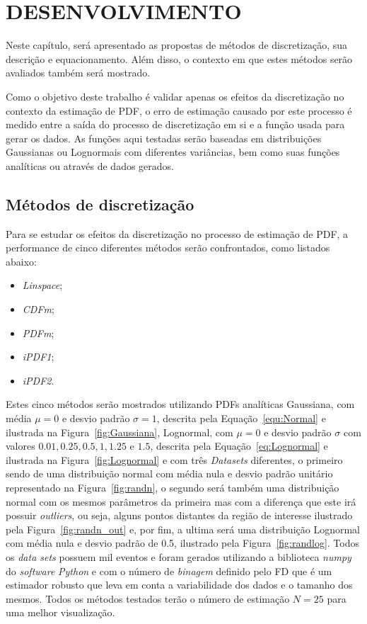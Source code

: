 \chapter{DESENVOLVIMENTO} \label{cap:desenvolvimento}
Neste capítulo, será apresentado as propostas de métodos de discretização, sua descrição e equacionamento. Além disso, o contexto em que estes métodos serão avaliados também será mostrado.

Como o objetivo deste trabalho é validar apenas os efeitos da discretização no contexto da estimação de \ac{PDF}, o erro de estimação causado por este processo é medido entre a saída do processo de discretização em si e a função usada para gerar os dados. As funções aqui testadas serão baseadas em distribuições Gaussianas ou Lognormais com diferentes variâncias, bem como suas funções analíticas ou através de dados gerados.

\section{Métodos de discretização}
\label{cap:anal}
Para se estudar os efeitos da discretização no processo de estimação de \ac{PDF}, a performance de cinco diferentes métodos serão confrontados, como listados abaixo: 
\begin{itemize}
	\item \textit{Linspace};
	\item \textit{CDFm};
	\item \textit{PDFm};
	\item \textit{iPDF1};
	\item \textit{iPDF2}.
\end{itemize}

Estes cinco métodos serão mostrados utilizando \ac{PDF}s analíticas Gaussiana, com média $\mu = 0$ e desvio padrão $\sigma = 1$, descrita pela Equação~\eqref{equ:Normal} e ilustrada na Figura~\ref{fig:Gaussiana}, Lognormal, com $\mu = 0$ e desvio padrão $\sigma$ com valores $0.01, 0.25, 0.5, 1, 1.25$ e $1.5$, descrita pela Equação~\eqref{eq:Lognormal} e ilustrada na Figura~\ref{fig:Lognormal} e com três \textit{Datasets} diferentes, o primeiro sendo de uma distribuição normal com média nula e desvio padrão unitário representado na Figura~\ref{fig:randn}, o segundo será também uma distribuição normal com os mesmos parâmetros da primeira mas com a diferença que este irá possuir \textit{outliers}, ou seja, alguns pontos distantes da região de interesse ilustrado pela Figura~\ref{fig:randn_out} e, por fim, a ultima será uma distribuição Lognormal com média nula e desvio padrão de 0.5, ilustrado pela Figura~\ref{fig:randlog}. Todos os \textit{data sets} possuem mil eventos e foram gerados utilizando a biblioteca \textit{numpy} do \textit{software} \textit{Python} e com o número de \textit{binagem} definido pelo \ac{FD} que é um estimador robusto que leva em conta a variabilidade dos dados e o tamanho dos mesmos. Todos os métodos testados terão o número de estimação $N = 25$ para uma melhor visualização.


